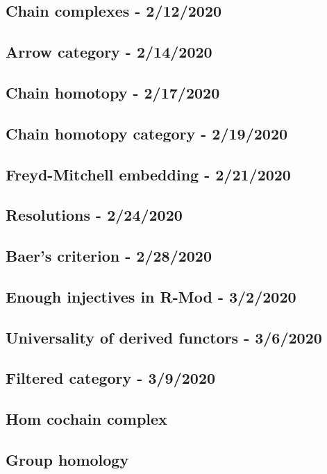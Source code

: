 \documentclass[../main.tex]{subfiles}
\begin{document}
\subsection{Chain complexes - 2/12/2020}

\newpage

\subsection{Arrow category - 2/14/2020}

\newpage

\subsection{Chain homotopy - 2/17/2020}

\newpage

\subsection{Chain homotopy category - 2/19/2020}

\newpage

\subsection{Freyd-Mitchell embedding - 2/21/2020}

\newpage

\subsection{Resolutions - 2/24/2020}

\newpage

\subsection{Baer's criterion - 2/28/2020}

\newpage

\subsection{Enough injectives in R-Mod - 3/2/2020}

\newpage

\subsection{Universality of derived functors - 3/6/2020}

\newpage

\subsection{Filtered category - 3/9/2020}

\newpage

\subsection{Hom cochain complex}

\newpage

\subsection{Group homology}

\newpage
\end{document}

